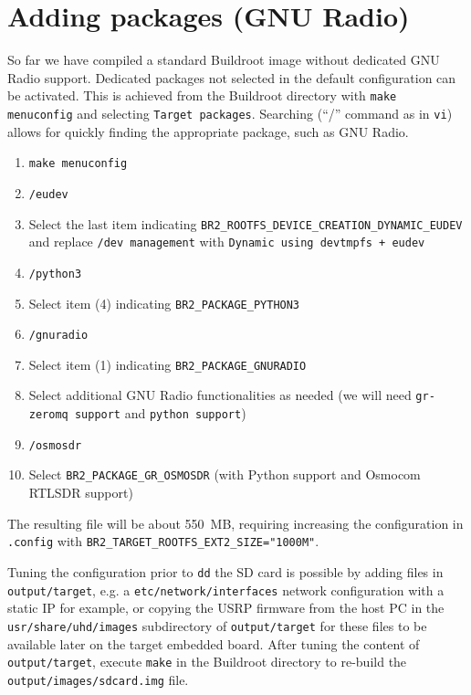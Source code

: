 \documentclass[a4paper]{article}
\begin{document}
\section{Adding packages (GNU Radio)}

So far we have compiled a standard Buildroot image without dedicated GNU Radio support.
Dedicated packages not selected in the default configuration can be activated. This is 
achieved from the Buildroot directory with {\tt make menuconfig} and selecting {\tt Target 
packages}. Searching (``/'' command as in {\tt vi}) allows for quickly finding the appropriate
package, such as GNU Radio. 

\begin{enumerate}
\item \verb~make menuconfig~
\item \verb~/eudev~
\item Select the last item indicating {\tt BR2\_ROOTFS\_DEVICE\_CREATION\_DYNAMIC\_EUDEV} and
replace {\tt /dev management} with {\tt Dynamic using devtmpfs + eudev}
\item \verb~/python3~
\item Select item (4) indicating {\tt BR2\_PACKAGE\_PYTHON3}
\item \verb~/gnuradio~
\item Select item (1) indicating {\tt BR2\_PACKAGE\_GNURADIO}
\item Select additional GNU Radio functionalities as needed (we will need {\tt gr-zeromq support}
and {\tt python support})
\item \verb~/osmosdr~
\item Select {\tt BR2\_PACKAGE\_GR\_OSMOSDR} (with Python support and Osmocom RTLSDR support)
\end{enumerate}

The resulting file will be about 550~MB, requiring increasing the configuration in {\tt .config}
with {\tt BR2\_TARGET\_ROOTFS\_EXT2\_SIZE="1000M"}.

Tuning the configuration prior to {\tt dd} the SD card is possible by adding files
in {\tt output/target}, e.g. a {\tt etc/network/interfaces} network configuration with
a static IP for example, or copying the USRP firmware from the host PC in the
{\tt usr/share/uhd/images} subdirectory of {\tt output/target} for these files to be
available later on the target embedded board. After tuning the content of {\tt output/target},
execute {\tt make} in the Buildroot directory to re-build the {\tt output/images/sdcard.img}
file.
\end{document}
